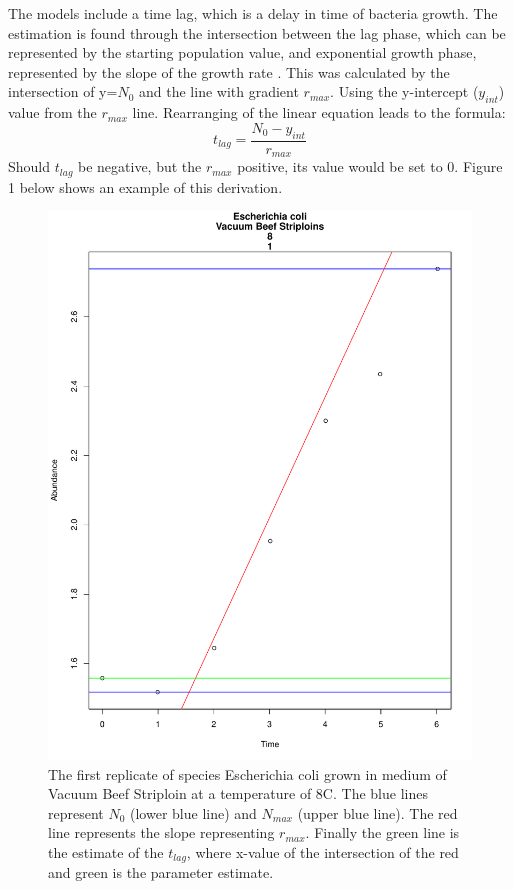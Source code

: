 \documentclass[11pt]{article}
\begin{document}
The models include a time lag, which is a delay in time of bacteria growth. The estimation is found through the intersection between the lag phase, which can be represented by the starting population value, and exponential growth phase, represented by the slope of the growth rate \cite{peleg2011microbial}. This was calculated by the intersection of y=$N_0$ and the line with gradient $r_{max}$. Using the y-intercept ($y_{int}$) value from the $r_{max}$ line. Rearranging of the linear equation leads to the formula:
\begin{equation*}
   t_{lag}=\frac{N_0 - y_{int}}{r_{max}}
\end{equation*}
Should $t_{lag}$ be negative, but the $r_{max}$ positive, its value would be set to $0$. Figure 1 below shows an example of this derivation.
\begin{figure}[h]
\centering
\includegraphics[scale=0.5]{../Results/Parameters_Ecoli.pdf}
\caption{The first replicate of species Escherichia coli grown in medium of Vacuum Beef Striploin at a temperature of 8\degree C. The blue lines represent $N_0$ (lower blue line) and $N_{max}$ (upper blue line). The red line represents the slope representing $r_{max}$. Finally the green line is the estimate of the $t_{lag}$, where x-value of the intersection of the red and green is the parameter estimate.}
\label{fig:Starting parameters}
\end{figure}
\end{document}
